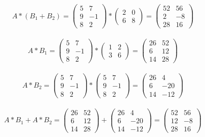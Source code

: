 \documentclass[a4paper]{scrartcl}
\begin{document}
\begin{enumerate}
\begin{enumerate}[a)]
\begin{align*}
A*(B_1 + B_2) =
\begin{pmatrix}
5 & 7 \\
9 & -1 \\
8 & 2
\end{pmatrix}
*
\begin{pmatrix}
2 & 0 \\
6 & 8
\end{pmatrix}
=
\begin{pmatrix}
52 & 56 \\
2 & -8 \\
28 & 16
\end{pmatrix}
\end{align*}

\begin{align*}
A*B_1 =
\begin{pmatrix}
5 & 7 \\
9 & -1 \\
8 & 2
\end{pmatrix}
*
\begin{pmatrix}
1 & 2 \\
3 & 6
\end{pmatrix}
=
\begin{pmatrix}
26 & 52 \\
6 & 12 \\
14 & 28
\end{pmatrix}
\end{align*}

\begin{align*}
A*B_2 =
\begin{pmatrix}
5 & 7 \\
9 & -1 \\
8 & 2
\end{pmatrix}
*
\begin{pmatrix}
5 & 7 \\
9 & -1 \\
8 & 2
\end{pmatrix}
=
\begin{pmatrix}
26 & 4 \\
6 & -20 \\
14 & -12
\end{pmatrix}
\end{align*}

\begin{align*}
A*B_1+A*B_2 =
\begin{pmatrix}
26 & 52 \\
6 & 12 \\
14 & 28
\end{pmatrix}
+
\begin{pmatrix}
26 & 4 \\
6 & -20 \\
14 & -12
\end{pmatrix}
=
\begin{pmatrix}
52 & 56 \\
12 & -8 \\
28 & 16
\end{pmatrix}
\end{align*}


\end{enumerate}
\end{enumerate}
\end{document}
